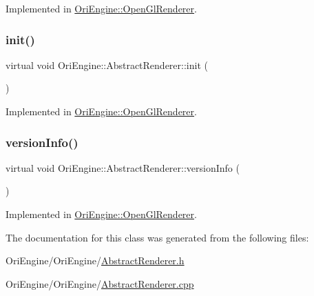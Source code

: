 Implemented in \hyperlink{class_ori_engine_1_1_open_gl_renderer_ad75e25784e6aa3331f69b81b1b3774ff}{Ori\+Engine\+::\+Open\+Gl\+Renderer}.

\hypertarget{class_ori_engine_1_1_abstract_renderer_a2af2aba80028b0aa4cca39097e1fdf6d}{}\label{class_ori_engine_1_1_abstract_renderer_a2af2aba80028b0aa4cca39097e1fdf6d} 
\subsubsection{\texorpdfstring{init()}{init()}}
{\footnotesize\ttfamily virtual void Ori\+Engine\+::\+Abstract\+Renderer\+::init (\begin{DoxyParamCaption}{ }\end{DoxyParamCaption})\hspace{0.3cm}{\ttfamily [pure virtual]}}



Implemented in \hyperlink{class_ori_engine_1_1_open_gl_renderer_a702c4cfb099f77a04111740b9f3834e8}{Ori\+Engine\+::\+Open\+Gl\+Renderer}.

\hypertarget{class_ori_engine_1_1_abstract_renderer_a978fc31cfc5fc8c2cafa3d33367fdb32}{}\label{class_ori_engine_1_1_abstract_renderer_a978fc31cfc5fc8c2cafa3d33367fdb32} 
\subsubsection{\texorpdfstring{version\+Info()}{versionInfo()}}
{\footnotesize\ttfamily virtual void Ori\+Engine\+::\+Abstract\+Renderer\+::version\+Info (\begin{DoxyParamCaption}{ }\end{DoxyParamCaption})\hspace{0.3cm}{\ttfamily [pure virtual]}}



Implemented in \hyperlink{class_ori_engine_1_1_open_gl_renderer_aaf6633305987ddf18d0a6e5e15e93352}{Ori\+Engine\+::\+Open\+Gl\+Renderer}.



The documentation for this class was generated from the following files\+:\begin{DoxyCompactItemize}
\item 
Ori\+Engine/\+Ori\+Engine/\hyperlink{_abstract_renderer_8h}{Abstract\+Renderer.\+h}\item 
Ori\+Engine/\+Ori\+Engine/\hyperlink{_abstract_renderer_8cpp}{Abstract\+Renderer.\+cpp}\end{DoxyCompactItemize}
